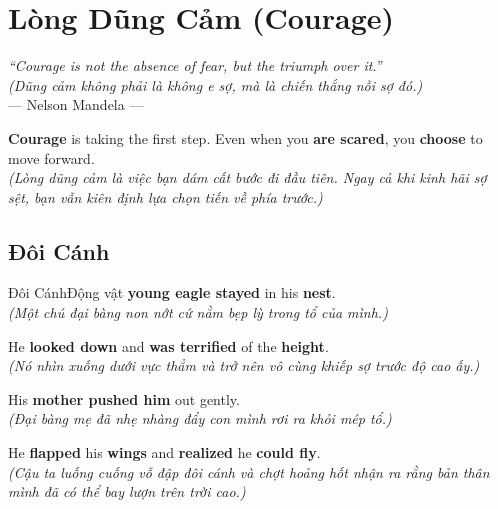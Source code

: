 \chapter{Lòng Dũng Cảm (Courage)}

\begin{center}
  \textit{\color{truyenblue}``Courage is not the absence of fear, but the triumph over it.''}\\
  \textit{(Dũng cảm không phải là không e sợ, mà là chiến thắng nỗi sợ đó.)}\\[4pt]
  \small\color{truyengold}--- Nelson Mandela ---
\end{center}

\ngancach

\begin{tcolorbox}[
  colback=truyenred!5, colframe=truyenred!40, arc=6pt,
  title={\bfseries Vượt Qua Ranh Giới (Crossing Boundaries)},
  fonttitle=\bfseries\color{truyenred}
]
  \textbf{Courage} is taking the first step. Even when you \textbf{are scared}, you \textbf{choose} to move forward.
  \\ \textit{(Lòng dũng cảm là việc bạn dám cất bước đi đầu tiên. Ngay cả khi kinh hãi sợ sệt, bạn vẫn kiên định lựa chọn tiến về phía trước.)}
\end{tcolorbox}

\vspace{0.6cm}


\ngayDay{}
\section{Đôi Cánh}
\begin{truyen}{Đôi Cánh}{Động vật}
 \textbf{young eagle stayed} in his \textbf{nest}.\\
\textit{(Một chú đại bàng non nớt cứ nằm bẹp lỳ trong tổ của mình.)}

He \textbf{looked down} and \textbf{was terrified} of the \textbf{height}.\\
\textit{(Nó nhìn xuống dưới vực thẳm và trở nên vô cùng khiếp sợ trước độ cao ấy.)}

His \textbf{mother pushed him} out gently.\\
\textit{(Đại bàng mẹ đã nhẹ nhàng đẩy con mình rơi ra khỏi mép tổ.)}

He \textbf{flapped} his \textbf{wings} and \textbf{realized} he \textbf{could fly}.\\
\textit{(Cậu ta luống cuống vỗ đập đôi cánh và chợt hoảng hốt nhận ra rằng bản thân mình đã có thể bay lượn trên trời cao.)}
\end{truyen}

